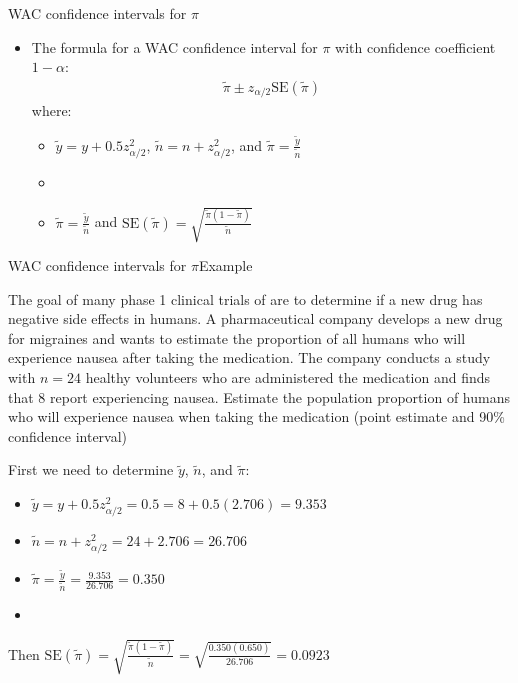 \documentclass[xcolor=dvipsnames]{beamer}
\begin{document}
\begin{frame}{WAC confidence intervals for $\pi$}
	\begin{itemize}
		\item The formula for a WAC confidence interval for $\pi$ with confidence coefficient $1-\alpha$:  \pause
		\begin{gather*}
		\tilde{\pi} \pm z_{\alpha/2} \text{SE}(\tilde{\pi})
		\end{gather*}  \pause
		where:
		\begin{itemize}
			\item $\tilde{y} = y + 0.5 z_{\alpha/2}^2$, $\tilde{n} = n + z_{\alpha/2}^2$, and $\tilde{\pi}=\frac{\tilde{y}}{\tilde{n}}$  
			\item[]
			\item $\tilde{\pi} = \frac{\tilde{y}}{\tilde{n}}$ and $\text{SE}(\tilde{\pi}) = \sqrt{\frac{\tilde{\pi}(1-\tilde{\pi})}{\tilde{n}}}$
		\end{itemize}
	\end{itemize}
\end{frame}

\begin{frame}{WAC confidence intervals for $\pi$}{Example}
	\begin{itemize} {\tiny
			\item The goal of many phase 1 clinical trials of are to determine if a new drug has negative side effects in humans. A pharmaceutical company develops a new drug for migraines and wants to estimate the proportion of all humans who will experience nausea after taking the medication. The company conducts a study with $n = 24$ healthy volunteers who are administered the medication and finds that 8 report experiencing nausea. Estimate the population proportion of humans who will experience nausea when taking the medication (point estimate and 90\% confidence interval) }  \pause
		\item[]
		\item First we need to determine $\tilde{y}$, $\tilde{n}$, and $\tilde{\pi}$:  \pause
		\begin{itemize}
			\item $\tilde{y} = y + 0.5 z_{\alpha/2}^2 = 0.5 = 8 + 0.5(2.706) = 9.353$ \pause
			\item $\tilde{n} = n + z_{\alpha/2}^2 = 24 + 2.706 = 26.706$ \pause
			\item $\tilde{\pi}=\frac{\tilde{y}}{\tilde{n}} = \frac{9.353}{26.706} = 0.350$ \pause
			\item[]
		\end{itemize}
		\item Then $\text{SE}(\tilde{\pi}) = \sqrt{\frac{\tilde{\pi}(1-\tilde{\pi})}{\tilde{n}}} = \sqrt{\frac{0.350(0.650)}{26.706}} = 0.0923$
	\end{itemize}
\end{frame}
\end{document}
